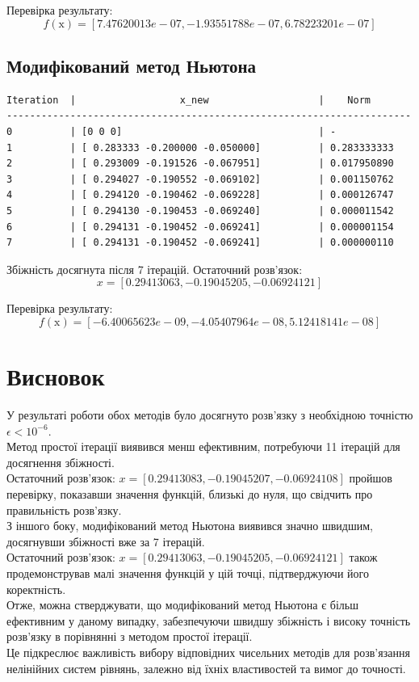 \documentclass[a4paper, 12pt]{article}
\begin{document}
Перевірка результату:
\[
f(\text{x}) = [ 7.47620013e-07, -1.93551788e-07,  6.78223201e-07]
\]

\subsection{Модифікований метод Ньютона}

\begin{verbatim}
Iteration  |                  x_new                   |    Norm   
----------------------------------------------------------------------
0          | [0 0 0]                                  | -
1          | [ 0.283333 -0.200000 -0.050000]          | 0.283333333
2          | [ 0.293009 -0.191526 -0.067951]          | 0.017950890
3          | [ 0.294027 -0.190552 -0.069102]          | 0.001150762
4          | [ 0.294120 -0.190462 -0.069228]          | 0.000126747
5          | [ 0.294130 -0.190453 -0.069240]          | 0.000011542
6          | [ 0.294131 -0.190452 -0.069241]          | 0.000001154
7          | [ 0.294131 -0.190452 -0.069241]          | 0.000000110
\end{verbatim}

Збіжність досягнута після 7 ітерацій. Остаточний розв'язок:
\[
x = [ 0.29413063, -0.19045205, -0.06924121]
\]

Перевірка результату:
\[
f(\text{x}) = [-6.40065623e-09, -4.05407964e-08,  5.12418141e-08]
\]

\newpage
\section{Висновок}

У результаті роботи обох методів було досягнуто розв'язку з необхідною точністю \(\epsilon < 10^{-6}\). \\ 

Метод простої ітерації виявився менш ефективним, потребуючи 11 ітерацій для досягнення збіжності. \\ 
Остаточний розв'язок: \(x = [0.29413083, -0.19045207, -0.06924108]\) пройшов перевірку, показавши значення функцій, близькі до нуля, що свідчить про правильність розв'язку. \\ 

З іншого боку, модифікований метод Ньютона виявився значно швидшим, досягнувши збіжності вже за 7 ітерацій. \\ 
Остаточний розв'язок: \(x = [0.29413063, -0.19045205, -0.06924121]\) також продемонстрував малі значення функцій у цій точці, підтверджуючи його коректність. \\ 

Отже, можна стверджувати, що модифікований метод Ньютона є більш ефективним у даному випадку, забезпечуючи швидшу збіжність і високу точність розв'язку в порівнянні з методом простої ітерації. \\ 

Це підкреслює важливість вибору відповідних чисельних методів для розв'язання нелінійних систем рівнянь, залежно від їхніх властивостей та вимог до точності.
\end{document}
